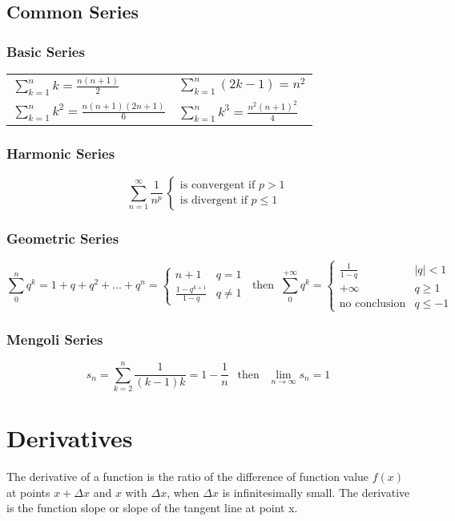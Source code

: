 \subsection{Common Series}
\subsubsection{Basic Series}

\begin{tabular}{ l l }
$ \displaystyle \sum_{k=1}^n k = \frac{n(n+1)}{2} $ &
$ \displaystyle \sum_{k=1}^n (2k-1) = n^2 $ \\ [1.5em]
$ \displaystyle \sum_{k=1}^n k^2 = \frac{n(n+1)(2n+1)}{6} $ & 
$ \displaystyle \sum_{k=1}^n k^3 = \frac{n^2(n+1)^2}{4} $
\end{tabular}

\subsubsection{Harmonic Series}
\[
\sum_{n=1}^\infty \frac{1}{n^p} ~ \begin{cases}
									\text{is convergent if } p>1 \\
									\text{is divergent if } p\leq1
									\end{cases}
\]

\subsubsection{Geometric Series}
\[
\sum_{0}^{n}q^k=1+q+q^2+...+q^n= \begin{cases}
									n+1 & q=1 \\
									\frac{1-q^{k+1}}{1-q} & q\ne1
								 \end{cases}
~ \text{ then } ~
\sum_{0}^{+\infty}q^k= \begin{cases}
\frac{1}{1-q} & \left|q\right|<1 \\
+\infty & q\ge1 \\
\text{no conclusion} & q\le-1
\end{cases}
\]

\subsubsection{Mengoli Series}
\[
s_n=\sum_{k=2}^{n}\frac{1}{(k-1)k}=1-\frac{1}{n} ~~ \text{ then } ~~  \lim_{n\rightarrow\infty}s_n=1
\]

\section{Derivatives}
The derivative of a function is the ratio of the difference of function value $ f(x) $ at points $ x+\Delta x $ and $ x $ with $ \Delta x $, when $ \Delta x $ is infinitesimally small. The derivative is the function slope or slope of the tangent line at point x.

